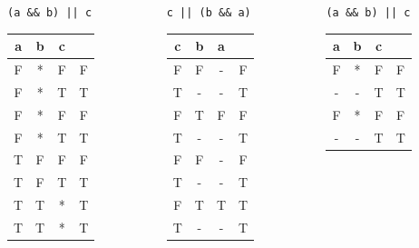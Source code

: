 \documentclass[xcolor = {dvipsnames, table}]{beamer}
\begin{document}
\begin{frame}
    \begin{columns}
        \begin{column}{0.3\textwidth}
            \centering
            \lstinline{(a && b) || c}
            \begin{tabular}{c c c c}
                a & b & c & \\
                \hline
                F & * & F & F \\
                F & * & T & T \\
                F & * & F & F \\
                F & * & T & T \\

                T & F & F & F \\
                T & F & T & T \\
                T & T & * & T \\
                T & T & * & T \\
            \end{tabular}
        \end{column}

        \begin{column}{0.3\textwidth}
            \centering
            \lstinline{c || (b && a)}
            \begin{tabular}{c c c c}
                c & b & a & \\
                \hline
                F & F & - & F \\
                T & - & - & T \\
                F & T & F & F \\
                T & - & - & T \\

                F & F & - & F \\
                T & - & - & T \\
                F & T & T & T \\
                T & - & - & T \\
            \end{tabular}
        \end{column}

        \begin{column}{0.3\textwidth}
            \centering
            \lstinline{(a && b) || c}
            \begin{tabular}{c c c c}
                a & b & c & \\
                \hline
                F & * & F & F \\
                - & - & T & T \\
                F & * & F & F \\
                - & - & T & T \\


\end{tabular}
\end{column}
\end{columns}
\end{frame}
\end{document}
